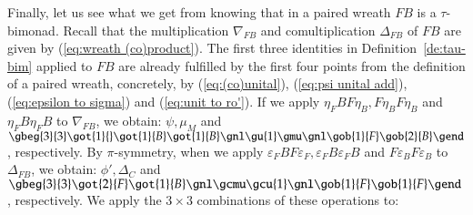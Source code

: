 \documentclass[a4paper, 12pt]{article}
\renewcommand{\_}[1]{\mbox{$_{\left( #1 \right)}$}}
\theoremstyle{plain}
\newcommand{\Epsilon}{\varepsilon}
\newcommand{\equref}[1]{(\ref{eq:#1})}
\newcommand{\deref}[1]{Definition~\ref{de:#1}}
\begin{document}
\bigskip

Finally, let us see what we get from knowing that in a paired wreath $FB$ is a $\tau$-bimonad. Recall that the multiplication $\nabla_{FB}$ and comultiplication 
$\Delta_{FB}$ of $FB$ are given by \equref{wreath (co)product}. The first three identities in \deref{tau-bim} applied to $FB$ are already fulfilled by the first four points 
from the definition of a paired wreath, concretely, by \equref{(co)unital}, \equref{psi unital add}, \equref{epsilon to sigma} and \equref{unit to ro'}. 
If we apply 
%
$\eta_F BF\eta_B, F\eta_B F\eta_B$ and $\eta_F B\eta_F B$ 
%
to $\nabla_{FB}$, we obtain: $\psi, \mu_M$ 
and $\gbeg{3}{3}
\got{1}{} \got{1}{B} \got{1}{B} \gnl
\gu{1} \gmu \gnl
\gob{1}{F} \gob{2}{B}
\gend $, respectively. By $\pi$-symmetry, when we apply 
%
$\Epsilon_F BF\Epsilon_F, \Epsilon_F B\Epsilon_FB$ and $F\Epsilon_B F\Epsilon_B$ 
%
to $\Delta_{FB}$, we obtain: $\phi', \Delta_C$ 
and $\gbeg{3}{3}
\got{2}{F} \got{1}{B} \gnl
\gcmu \gcu{1} \gnl
\gob{1}{F} \gob{1}{F}
\gend$, respectively. We apply the $3\times 3$ combinations of these operations to: 
\end{document}
